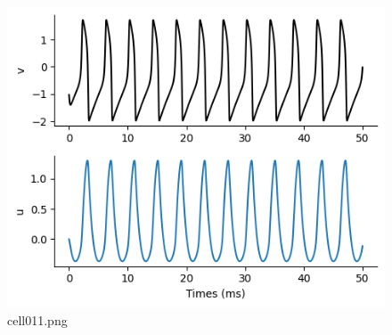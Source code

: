 \begin{figure}[ht]
	\centering
	\includegraphics[scale=0.8, max width=\linewidth]{./fig/neuron-model/fhn/cell011.png}
	\caption{cell011.png}
	\label{cell011.png}
\end{figure}